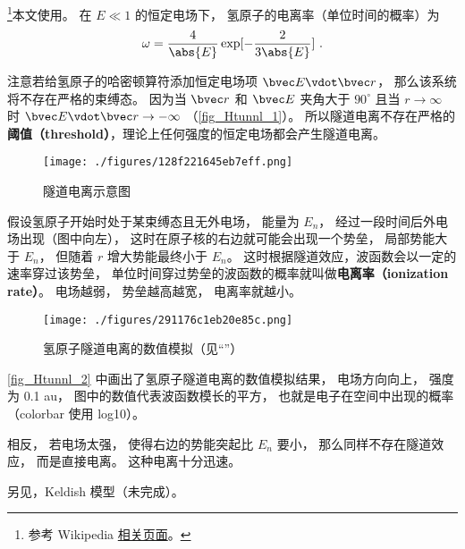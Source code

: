 

\footnote{参考 Wikipedia \href{https://en.wikipedia.org/wiki/Tunnel_ionization}{相关页面}。}本文使用。 在 $E \ll 1$ 的恒定电场下， 氢原子的电离率（单位时间的概率）为
\begin{equation}
\omega = \frac{4}{\abs{E}} \exp[-\frac{2}{3\abs{E}}]~.
\end{equation}

注意若给氢原子的哈密顿算符添加恒定电场项 $\bvec E \vdot \bvec r$， 那么该系统将不存在严格的束缚态。 因为当 $\bvec r$ 和 $\bvec E$ 夹角大于 $90^\circ$ 且当 $r\to\infty$ 时 $\bvec E \vdot \bvec r \to -\infty$ （\autoref{fig_Htunnl_1}）。 所以隧道电离不存在严格的\textbf{阈值（threshold）}，理论上任何强度的恒定电场都会产生隧道电离。

\begin{figure}[ht]
\centering
\texttt{[image: ./figures/128f221645eb7eff.png]}
\caption{隧道电离示意图} \label{fig_Htunnl_1}
\end{figure}

假设氢原子开始时处于某束缚态且无外电场， 能量为 $E_n$， 经过一段时间后外电场出现（图中向左）， 这时在原子核的右边就可能会出现一个势垒， 局部势能大于 $E_n$， 但随着 $r$ 增大势能最终小于 $E_n$。 这时根据隧道效应，波函数会以一定的速率穿过该势垒， 单位时间穿过势垒的波函数的概率就叫做\textbf{电离率（ionization rate）}。 电场越弱， 势垒越高越宽， 电离率就越小。

\begin{figure}[ht]
\centering
\texttt{[image: ./figures/291176c1eb20e85c.png]}
\caption{氢原子隧道电离的数值模拟（见“”）} \label{fig_Htunnl_2}
\end{figure}
\autoref{fig_Htunnl_2} 中画出了氢原子隧道电离的数值模拟结果， 电场方向向上， 强度为 0.1 au， 图中的数值代表波函数模长的平方， 也就是电子在空间中出现的概率（colorbar 使用 log10）。

相反， 若电场太强， 使得右边的势能突起比 $E_n$ 要小， 那么同样不存在隧道效应， 而是直接电离。 这种电离十分迅速。

另见，Keldish 模型（未完成）。

